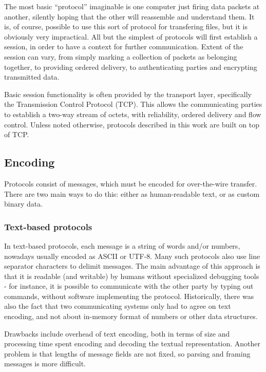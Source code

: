 The most basic ``protocol'' imaginable is one computer just firing data packets at another, silently hoping
that the other will reassemble and understand them. It is, of course, possible to use this sort of protocol
for transfering files, but it is obviously very impractical. All but the simplest of protocols will first
establish a session, in order to have a context for further communication. Extent of the session can vary,
from simply marking a collection of packets as belonging together, to providing ordered delivery, to
authenticating parties and encrypting transmitted data.

Basic session functionality is often provided by the transport layer, specifically the Transmission Control
Protocol (TCP). This allows the communicating parties to establish a two-way stream of octets, with
reliability, ordered delivery and flow control. Unless noted otherwise, protocols described in this work are
built on top of TCP.


\subsection{Encoding}

Protocols consist of messages, which must be encoded for over-the-wire transfer. There are two main ways to do
this: either as human-readable text, or as custom binary data.

\subsubsection{Text-based protocols}

In text-based protocols, each message is a string of words and/or numbers, nowadays usually encoded as ASCII
or UTF-8. Many such protocols also use line separator characters to delimit messages. The main advantage of
this approach is that it is readable (and writable) by humans without specialized debugging tools - for
instance, it is possible to communicate with the other party by typing out commands, without software
implementing the protocol.  Historically, there was also the fact that two communicating systems only had to
agree on text encoding, and not about in-memory format of numbers or other data structures.

Drawbacks include overhead of text encoding, both in terms of size and processing time spent encoding and
decoding the textual representation. Another problem is that lengths of message fields are not fixed, so
parsing and framing messages is more difficult.

